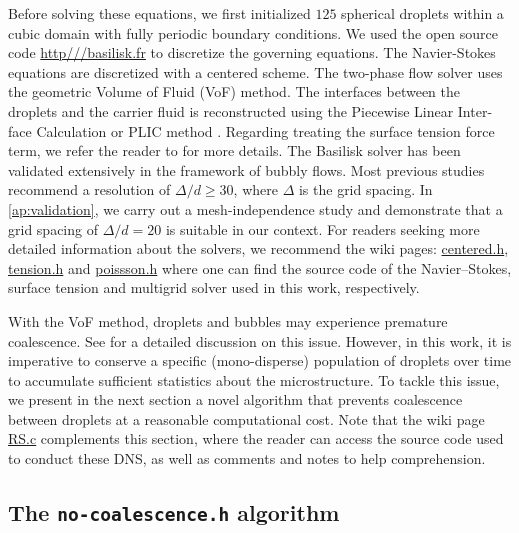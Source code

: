\documentclass[11pt]{My_preprint}
\providecommand{\DIFadd}[1]{{\protect\color{blue}\uwave{#1}}} %
\providecommand{\DIFdel}[1]{{\protect\color{red}\sout{#1}}}                      %
\providecommand{\DIFaddbegin}{} %
\providecommand{\DIFaddend}{} %
\providecommand{\DIFdelbegin}{} %
\providecommand{\DIFdelend}{} %
\begin{document}
Before solving these equations, we first initialized $125$ spherical droplets within a cubic domain with fully periodic boundary conditions. 
We used the open source code \url{http///basilisk.fr} to discretize the governing equations. 
The Navier-Stokes equations are discretized with a centered scheme.
The two-phase flow solver uses the geometric Volume of Fluid (VoF) method. 
The interfaces between the droplets and the carrier fluid is reconstructed using the Piecewise Linear Inter-face Calculation or PLIC method \citet[Chapter 5.]{tryggvason2011direct}.
Regarding treating the surface tension force term, we refer the reader to \citet{popinet2018numerical} for more details. 
The Basilisk solver has been validated extensively in the framework of bubbly flows. 
Most previous studies \citep{hidman2023assessing,innocenti2020direct} recommend a resolution of \DIFdelbegin \DIFdel{$\Delta/d \ge  30$}\DIFdelend \DIFaddbegin \DIFadd{$d/\Delta \ge  30$}\DIFaddend , where $\Delta$ is the grid spacing. 
In \ref{ap:validation}, we carry out a mesh-independence study and demonstrate that a grid spacing of \DIFdelbegin \DIFdel{$\Delta/d = 20$ }\DIFdelend \DIFaddbegin \DIFadd{$d/\Delta = 20$ }\DIFaddend is suitable in our context.
For readers seeking more detailed information about the solvers, we recommend the wiki pages: \href{http://basilisk.fr/src/navier-stokes/centered.h}{centered.h}, \href{http://basilisk.fr/src/tension.h}{tension.h} and \href{http://basilisk.fr/src/poissson.h}{poissson.h} where one can find the source code of the Navier--Stokes, surface tension and multigrid solver used in this work, respectively. 

With the VoF method, droplets and bubbles may experience premature coalescence.
See \citet[Appendix B]{innocenti2020direct} for a detailed discussion on this issue.
However, in this work, it is imperative to conserve a specific (mono-disperse) population of droplets over time to accumulate sufficient statistics about the microstructure.
To tackle this issue, we present in the next section a novel algorithm that prevents coalescence between droplets at a reasonable computational cost. 
Note that the wiki page \href{http://basilisk.fr/sandbox/fintzin/Rising-suspension/RS.c}{RS.c} complements this section, where the reader can access the source code used to conduct these DNS, as well as comments and notes to help comprehension. 




 \subsection{The \texttt{no-coalescence.h} algorithm}
\end{document}
